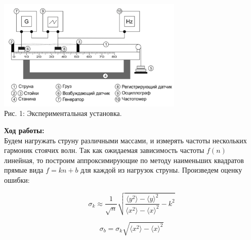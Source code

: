 \documentclass[8pt]{article}
\begin{document}
    \begin{center} 
        \includegraphics[width=3.5in]{string_img.png} \\ Рис. 1: Экспериментальная установка.
    \end{center}
    
    \textbf{Ход работы:}\\
         Будем нагружать струну различными массами, и измерять частоты нескольких гармоник стоячих волн.
    Так как ожидаемая зависимость частоты $f\left(n\right)$ линейная, то построим аппроксимирующие по методу наименьших квадратов прямые вида $f = kn + b$ для каждой из нагрузок струны.
    Произведем оценку ошибки:

    \begin{equation}
            \sigma_{k} \approx \frac{1}{\sqrt{n}}
                \sqrt{\frac{\langle y^2 \rangle -  \langle y \rangle ^2}
                        {\langle x^2 \rangle - \langle x \rangle ^2} 
                    - k^2} 
    \end{equation}

    \begin{equation}
            \sigma_{b} = \sigma_{k} \sqrt{\langle x^2 \rangle - \langle x \rangle ^2} 
    \end{equation}
    
\end{document}
